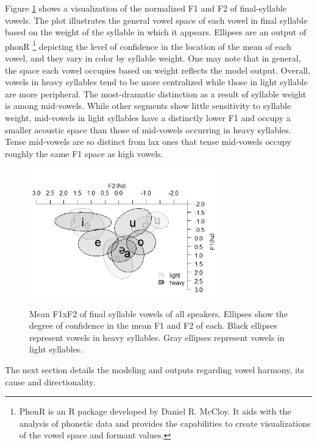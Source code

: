 \documentclass[12pt]{ouparticle}
\begin{document}
\newpage

Figure \ref{fig:ellipses_final} shows a visualization of the normalized F1 and F2 of final-syllable vowels. The plot illustrates the general vowel space of each vowel in final syllable based on the weight of the syllable in which it appears. Ellipses are an output of phonR \footnote{PhonR is an R package developed by Daniel R. McCloy. It aids with the analysis of phonetic data and provides the capabilities to create visualizations of the vowel space and formant values.} \citep{mccloy2016} depicting the level of confidence in the location of the mean of each vowel, and they vary in color by syllable weight. One may note that in general, the space each vowel occupies based on weight reflects the model output. Overall, vowels in heavy syllables tend to be more centralized while those in light syllable are more peripheral. The most-dramatic distinction as a result of syllable weight is among mid-vowels. While other segments show little sensitivity to syllable weight, mid-vowels in light syllables have a distinctly lower F1 and occupy a smaller acoustic space than those of mid-vowels occurring in heavy syllables. Tense mid-vowels are so distinct from lax ones that tense mid-vowels occupy roughly the same F1 space as high vowels.

\begin{figure}[h!]
    \centering
    \caption{Mean F1xF2 of final syllable vowels of all speakers. Ellipses show the degree of confidence in the mean F1 and F2 of each. Black ellipses represent vowels in heavy syllables. Gray ellipses represent vowels in light syllables.}
    \includegraphics[width=0.75\textwidth]{Figure4.jpg}
    \label{fig:ellipses_final}
\end{figure}

\newpage


The next section details the modeling and outputs regarding vowel harmony, its cause and directionality.
\end{document}
